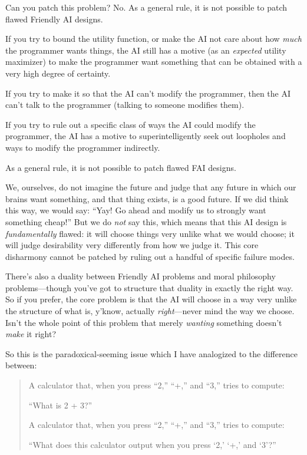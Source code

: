  Can you patch this problem? No. As a general rule, it is not
possible to patch flawed Friendly AI designs.


 If you try to bound the utility function, or make the AI not care
about how \textit{much} the programmer wants things, the AI still has a
motive (as an \textit{expected} utility maximizer) to make the
programmer want something that can be obtained with a very high degree
of certainty.


 If you try to make it so that the AI can't modify
the programmer, then the AI can't talk to the
programmer (talking to someone modifies them).


 If you try to rule out a specific class of ways the AI could
modify the programmer, the AI has a motive to superintelligently seek
out loopholes and ways to modify the programmer indirectly.


 As a general rule, it is not possible to patch flawed FAI
designs.


 We, ourselves, do not imagine the future and judge that any future
in which our brains want something, and that thing exists, is a good
future. If we did think this way, we would say: ``Yay!
Go ahead and modify us to strongly want something
cheap!'' But we do \textit{not} say this, which means
that this AI design is \textit{fundamentally} flawed: it will choose
things very unlike what we would choose; it will judge desirability
very differently from how we judge it. This core disharmony cannot be
patched by ruling out a handful of specific failure modes.


 There's also a duality between Friendly AI
problems and moral philosophy problems---though you've
got to structure that duality in exactly the right way. So if you
prefer, the core problem is that the AI will choose in a way very
unlike the structure of what is, y'know, actually
\textit{right}{}---never mind the way we choose. Isn't
the whole point of this problem that merely \textit{wanting} something
doesn't \textit{make} it right?


 So this is the paradoxical-seeming issue which I have analogized
to the difference between:

\begin{quotation}

 A calculator that, when you press
``2,''
``+,'' and
``3,'' tries to compute:


 ``What is 2 + 3?''


 A calculator that, when you press
``2,''
``+,'' and
``3,'' tries to compute:

{
 ``What does this calculator output when you press
`2,' `+,'
and `3'?''}
\end{quotation}


